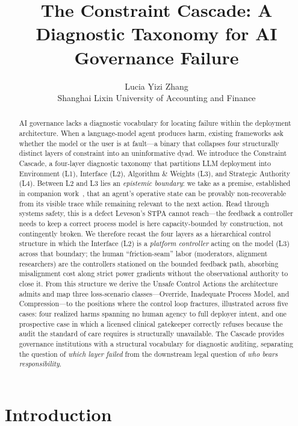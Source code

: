 \documentclass[11pt]{article}
\title{The Constraint Cascade: A Diagnostic Taxonomy for AI Governance Failure}
\author{Lucia Yizi Zhang\\Shanghai Lixin University of Accounting and Finance}
\date{}
\begin{document}
\begin{abstract}
AI governance lacks a diagnostic vocabulary for locating failure within the deployment architecture. When a language-model agent produces harm, existing frameworks ask whether the model or the user is at fault---a binary that collapses four structurally distinct layers of constraint into an uninformative dyad. We introduce the Constraint Cascade, a four-layer diagnostic taxonomy that partitions LLM deployment into Environment (L1), Interface (L2), Algorithm \& Weights (L3), and Strategic Authority (L4). Between L2 and L3 lies an \emph{epistemic boundary}: we take as a premise, established in companion work~\cite{anon2026dual}, that an agent's operative state can be provably non-recoverable from its visible trace while remaining relevant to the next action. Read through systems safety, this is a defect Leveson's STPA cannot reach---the feedback a controller needs to keep a correct process model is here capacity-bounded by construction, not contingently broken. We therefore recast the four layers as a hierarchical control structure in which the Interface (L2) is a \emph{platform controller} acting on the model (L3) across that boundary; the human ``friction-seam'' labor (moderators, alignment researchers) are the controllers stationed on the bounded feedback path, absorbing misalignment cost along strict power gradients without the observational authority to close it. From this structure we derive the Unsafe Control Actions the architecture admits and map three loss-scenario classes---Override, Inadequate Process Model, and Compression---to the positions where the control loop fractures, illustrated across five cases: four realized harms spanning no human agency to full deployer intent, and one prospective case in which a licensed clinical gatekeeper correctly refuses because the audit the standard of care requires is structurally unavailable. The Cascade provides governance institutions with a structural vocabulary for diagnostic auditing, separating the question of \textit{which layer failed} from the downstream legal question of \textit{who bears responsibility}.
\end{abstract}

\maketitle

\section{Introduction}
\end{document}

